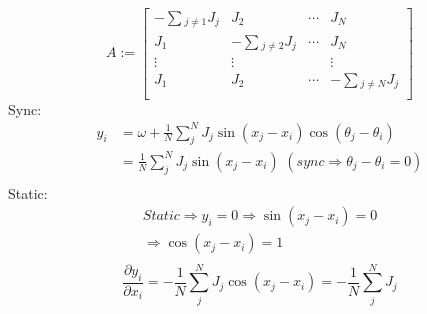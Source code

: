 \documentclass[10pt,aspectratio=43,mathserif,table]{beamer}
\begin{document}
\begin{frame}
    $$
    A:=\left[ \begin{matrix}
        -\sum{_{j\ne 1}J_j}&		J_2&		\cdots&		J_N\\
        J_1&		-\sum{_{j\ne 2}J_j}&		\cdots&		J_N\\
        \vdots&		\vdots&		\,\,&		\vdots\\
        J_1&		J_2&		\cdots&		-\sum{_{j\ne N}J_j}\\
    \end{matrix} \right] 
    $$
    Sync: 
    $$
    \begin{aligned}
        y_i&=\omega +\frac{1}{N}\sum_j^N{J_j\sin \left( x_j-x_i \right) \cos \left( \theta _j-\theta _i \right)}\\
        &=\frac{1}{N}\sum_j^N{J_j\sin \left( x_j-x_i \right) \,\,  \left( sync\Longrightarrow \theta _j-\theta _i=0 \right)}\\
    \end{aligned}
    $$
    Static: 
    $$
    \begin{array}{r}
        Static\Longrightarrow y_i=0\Longrightarrow \sin \left( x_j-x_i \right) =0\\
        \Longrightarrow \cos \left( x_j-x_i \right) =1\\
    \end{array}
    $$
    $$
    \frac{\partial y_i}{\partial x_i}=-\frac{1}{N}\sum_j^N{J_j\cos \left( x_j-x_i \right)}=-\frac{1}{N}\sum_j^N{J_j}
    $$

\end{frame}
\end{document}

